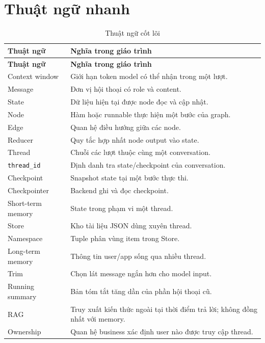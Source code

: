 \chapter{Thuật ngữ nhanh}
\label{app:glossary}

\begin{longtable}{p{4cm}p{10.6cm}}
\caption{Thuật ngữ cốt lõi}\label{tab:glossary}\\
\toprule
\textbf{Thuật ngữ} & \textbf{Nghĩa trong giáo trình} \\
\midrule
\endfirsthead
\toprule
\textbf{Thuật ngữ} & \textbf{Nghĩa trong giáo trình} \\
\midrule
\endhead
Context window & Giới hạn token model có thể nhận trong một lượt. \\
Message & Đơn vị hội thoại có role và content. \\
State & Dữ liệu hiện tại được node đọc và cập nhật. \\
Node & Hàm hoặc runnable thực hiện một bước của graph. \\
Edge & Quan hệ điều hướng giữa các node. \\
Reducer & Quy tắc hợp nhất node output vào state. \\
Thread & Chuỗi các lượt thuộc cùng một conversation. \\
\texttt{thread\_id} & Định danh tra state/checkpoint của conversation. \\
Checkpoint & Snapshot state tại một bước thực thi. \\
Checkpointer & Backend ghi và đọc checkpoint. \\
Short-term memory & State trong phạm vi một thread. \\
Store & Kho tài liệu JSON dùng xuyên thread. \\
Namespace & Tuple phân vùng item trong Store. \\
Long-term memory & Thông tin user/app sống qua nhiều thread. \\
Trim & Chọn lát message ngắn hơn cho model input. \\
Running summary & Bản tóm tắt tăng dần của phần hội thoại cũ. \\
RAG & Truy xuất kiến thức ngoài tại thời điểm trả lời; không đồng nhất với memory. \\
Ownership & Quan hệ business xác định user nào được truy cập thread. \\
\bottomrule
\end{longtable}

